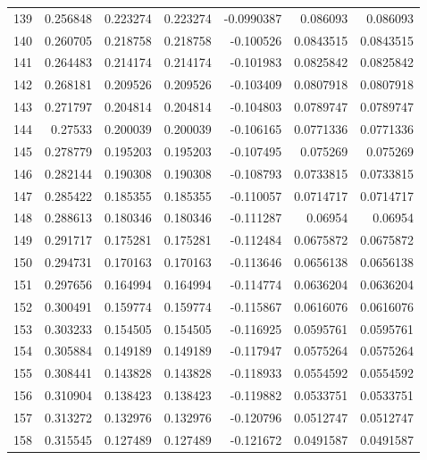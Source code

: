 \begin{tabular}{rrrrrrr}
 139 &  0.256848    & 0.223274    & 0.223274    & -0.0990387   & 0.086093    & 0.086093    \\
 140 &  0.260705    & 0.218758    & 0.218758    & -0.100526    & 0.0843515   & 0.0843515   \\
 141 &  0.264483    & 0.214174    & 0.214174    & -0.101983    & 0.0825842   & 0.0825842   \\
 142 &  0.268181    & 0.209526    & 0.209526    & -0.103409    & 0.0807918   & 0.0807918   \\
 143 &  0.271797    & 0.204814    & 0.204814    & -0.104803    & 0.0789747   & 0.0789747   \\
 144 &  0.27533     & 0.200039    & 0.200039    & -0.106165    & 0.0771336   & 0.0771336   \\
 145 &  0.278779    & 0.195203    & 0.195203    & -0.107495    & 0.075269    & 0.075269    \\
 146 &  0.282144    & 0.190308    & 0.190308    & -0.108793    & 0.0733815   & 0.0733815   \\
 147 &  0.285422    & 0.185355    & 0.185355    & -0.110057    & 0.0714717   & 0.0714717   \\
 148 &  0.288613    & 0.180346    & 0.180346    & -0.111287    & 0.06954     & 0.06954     \\
 149 &  0.291717    & 0.175281    & 0.175281    & -0.112484    & 0.0675872   & 0.0675872   \\
 150 &  0.294731    & 0.170163    & 0.170163    & -0.113646    & 0.0656138   & 0.0656138   \\
 151 &  0.297656    & 0.164994    & 0.164994    & -0.114774    & 0.0636204   & 0.0636204   \\
 152 &  0.300491    & 0.159774    & 0.159774    & -0.115867    & 0.0616076   & 0.0616076   \\
 153 &  0.303233    & 0.154505    & 0.154505    & -0.116925    & 0.0595761   & 0.0595761   \\
 154 &  0.305884    & 0.149189    & 0.149189    & -0.117947    & 0.0575264   & 0.0575264   \\
 155 &  0.308441    & 0.143828    & 0.143828    & -0.118933    & 0.0554592   & 0.0554592   \\
 156 &  0.310904    & 0.138423    & 0.138423    & -0.119882    & 0.0533751   & 0.0533751   \\
 157 &  0.313272    & 0.132976    & 0.132976    & -0.120796    & 0.0512747   & 0.0512747   \\
 158 &  0.315545    & 0.127489    & 0.127489    & -0.121672    & 0.0491587   & 0.0491587   \\

\end{tabular}
